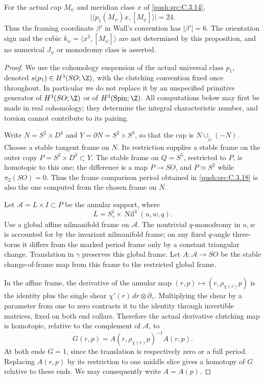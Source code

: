 \begin{proposition}\label{push:src:C.3.19}
For the actual cap $M_\psi$ and meridian class $x$ of \ref{push:src:C.3.14},
\[
 \bigl|\langle p_1(M_\psi)x,[M_\psi]\rangle\bigr|=24.
\]
Thus the framing coordinate $\beta'$ in Wall's convention has
$|\beta'|=6$. The orientation sign and the cubic
$k_\psi=\langle x^3,[M_\psi]\rangle$ are not determined by
this proposition, and no numerical $J_\psi$ or monodromy class
is asserted.
\end{proposition}
\begin{proof}
We use the cohomology suspension of the actual universal class
$p_1$, denoted $s(p_1)\in H^3(SO;\Z)$, with the clutching
convention fixed once throughout. In particular we do not
replace it by an unspecified primitive generator of
$H^3(SO;\Z)$ or of $H^3(\operatorname{Spin};\Z)$.
All computations below may first be made in real cohomology;
they determine the integral characteristic number, and torsion
cannot contribute to its pairing.

Write $N=S^2\times D^4$ and $Y=\partial N=S^2\times S^3$,
so that the cap is $N\cup_{\widetilde\psi}(-N)$. Choose a
stable tangent frame on $N$. Its restriction supplies a stable
frame on the outer copy $P=S^2\times D^3\subset Y$. The
stable frame on $Q=S^5$, restricted to $P$, is homotopic to
this one: the difference is a map $P\to SO$, and
$P\simeq S^2$ while $\pi_2(SO)=0$. Thus the frame comparison
period obtained in \ref{push:src:C.3.18} is also the one computed from the
chosen frame on $N$.

Let $\mathcal A=L\times I\subset P$ be the annular support,
where
\[
 L=S^1_\gamma\times\operatorname{Nil}^3(u,w,q).
\]
Use a global affine nilmanifold frame on $\mathcal A$.
The nontrivial $q$-monodromy in $u,w$ is accounted for by
the invariant nilmanifold frame; on any fixed $q$-angle
three-torus it differs from the marked period frame only
by a constant triangular change. Translation in $\gamma$
preserves this global frame. Let
$A:\mathcal A\to SO$ be the stable change-of-frame map
from this frame to the restricted global frame.

In the affine frame, the derivative of the annular map
$(r,p)\mapsto(r,\rho_{\chi(r)}p)$ is the identity plus
the single shear $\chi'(r)\,dr\otimes\partial_\gamma$.
Multiplying the shear by a parameter from one to zero
contracts it to the identity through invertible matrices,
fixed on both end collars. Therefore the actual derivative
clutching map is homotopic, relative to the complement of
$\mathcal A$, to
\[
 G(r,p)=A(r,\rho_{\chi(r)}p)^{-1}A(r,p).
\]
At both ends $G=1$, since the translation is respectively
zero or a full period. Replacing $A(r,p)$ by its restriction
to one middle slice gives a homotopy of $G$ relative to
these ends. We may consequently write $A=A(p)$.


\end{proof}
